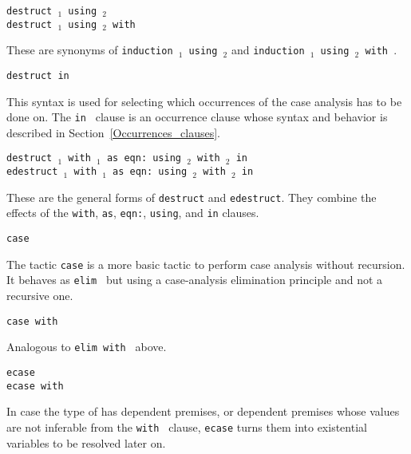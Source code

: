\begin{coq_example*}
\begin{Variants}
\item{\tt destruct {\term$_1$} using {\term$_2$}}\\
     {\tt destruct {\term$_1$} using {\term$_2$} with {\bindinglist}}

  These are synonyms of {\tt induction {\term$_1$} using {\term$_2$}} and
  {\tt induction {\term$_1$} using {\term$_2$} with {\bindinglist}}.

\item \texttt{destruct {\term} in {\occgoalset}}

  This syntax is used for selecting which occurrences of {\term} the
  case analysis has to be done on. The {\tt in {\occgoalset}} clause is an
  occurrence clause whose syntax and behavior is described in
  Section~\ref{Occurrences_clauses}.

\item{\tt destruct {\term$_1$} with {\bindinglist$_1$}
        as {\disjconjintropattern} eqn:{\namingintropattern}
        using {\term$_2$} with {\bindinglist$_2$} in {\occgoalset}}\\
     {\tt edestruct {\term$_1$} with {\bindinglist$_1$}
        as {\disjconjintropattern} eqn:{\namingintropattern}
        using {\term$_2$} with {\bindinglist$_2$} in {\occgoalset}}

  These are the general forms of {\tt destruct} and {\tt edestruct}.
  They combine the effects of the {\tt with}, {\tt as}, {\tt eqn:}, {\tt using},
  and {\tt in} clauses.

\item{\tt case \term}\label{case}

  The tactic {\tt case} is a more basic tactic to perform case
  analysis without recursion. It behaves as {\tt elim \term} but using
  a case-analysis elimination principle and not a recursive one.

\item {\tt case {\term} with {\bindinglist}}

  Analogous to {\tt elim {\term} with {\bindinglist}} above.

\item{\tt ecase {\term}}\\
  {\tt ecase {\term} with {\bindinglist}}

  In case the type of {\term} has dependent premises, or dependent
  premises whose values are not inferable from the {\tt with
  {\bindinglist}} clause, {\tt ecase} turns them into existential
  variables to be resolved later on.


\end{Variants}
\end{coq_example*}
